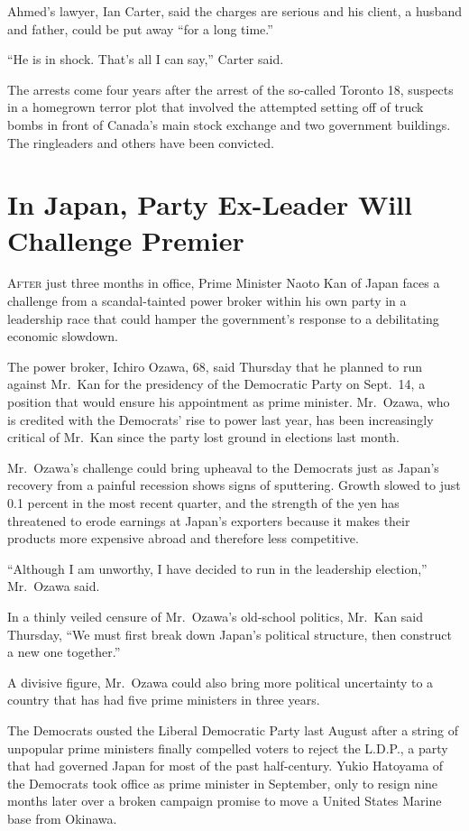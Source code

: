 ﻿\documentclass[12pt]{article}
\begin{document}
Ahmed's lawyer, Ian Carter, said the charges are serious and his client, a husband and father, could
be put away ``for a long time.''

``He is in shock. That's all I can say,'' Carter said.

The arrests come four years after the arrest of the so-called Toronto 18, suspects in a homegrown
terror plot that involved the attempted setting off of truck bombs in front of Canada's main stock
exchange and two government buildings. The ringleaders and others have been convicted.

\pagebreak
\section{In Japan, Party Ex-Leader Will Challenge Premier}

\lettrine{A}{fter} just three months in office, Prime Minister Naoto Kan of
Japan faces a challenge from a scandal-tainted power broker within his own party in a leadership
race that could hamper the government's response to a debilitating economic slowdown.

The power broker, Ichiro Ozawa, 68, said Thursday that he planned to run against Mr.~Kan for the
presidency of the Democratic Party on Sept.~14, a position that would ensure his appointment as
prime minister. Mr.~Ozawa, who is credited with the Democrats' rise to power last year, has been
increasingly critical of Mr.~Kan since the party lost ground in elections last month.

Mr.~Ozawa's challenge could bring upheaval to the Democrats just as Japan's recovery from a painful
recession shows signs of sputtering. Growth slowed to just 0.1 percent in the most recent quarter,
and the strength of the yen has threatened to erode earnings at Japan's exporters because it makes
their products more expensive abroad and therefore less competitive.

``Although I am unworthy, I have decided to run in the leadership election,'' Mr.~Ozawa said.

In a thinly veiled censure of Mr.~Ozawa's old-school politics, Mr.~Kan said Thursday, ``We must
first break down Japan's political structure, then construct a new one together.''

A divisive figure, Mr.~Ozawa could also bring more political uncertainty to a country that has had
five prime ministers in three years.

The Democrats ousted the Liberal Democratic Party last August after a string of unpopular prime
ministers finally compelled voters to reject the L.D.P., a party that had governed Japan for most of
the past half-century. Yukio Hatoyama of the Democrats took office as prime minister in September,
only to resign nine months later over a broken campaign promise to move a United States Marine base
from Okinawa.
\end{document}
